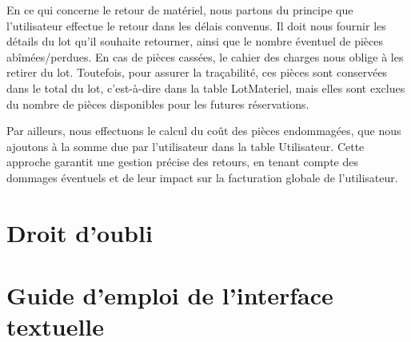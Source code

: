 En ce qui concerne le retour de matériel, nous partons du principe que l'utilisateur effectue le retour dans les délais convenus. Il doit nous fournir les détails du lot qu'il souhaite retourner, ainsi que le nombre éventuel de pièces abîmées/perdues. En cas de pièces cassées, le cahier des charges nous oblige à les retirer du lot. Toutefois, pour assurer la traçabilité, ces pièces sont conservées dans le total du lot, c'est-à-dire dans la table LotMateriel, mais elles sont exclues du nombre de pièces disponibles pour les futures réservations.

Par ailleurs, nous effectuons le calcul du coût des pièces endommagées, que nous ajoutons à la somme due par l'utilisateur dans la table Utilisateur. Cette approche garantit une gestion précise des retours, en tenant compte des dommages éventuels et de leur impact sur la facturation globale de l'utilisateur.


\section{Droit d'oubli}

\section{Guide d'emploi de l'interface textuelle}




